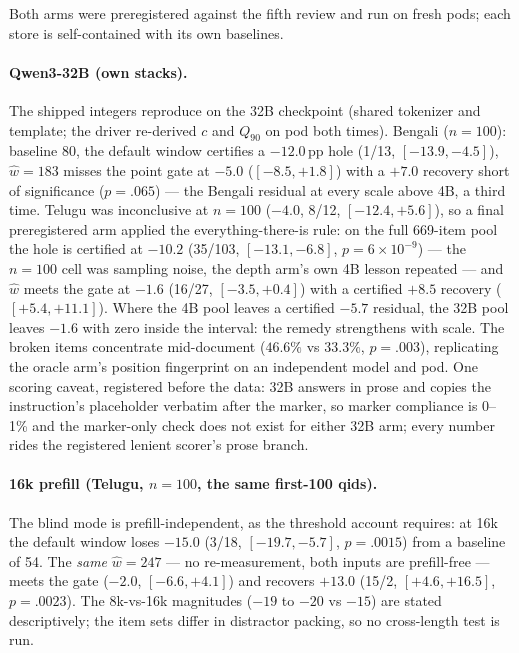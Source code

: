 \documentclass{article}
\begin{document}
Both arms were preregistered against the fifth review and run on
fresh pods; each store is self-contained with its own baselines.

\paragraph{Qwen3-32B (own stacks).} The shipped integers reproduce
on the 32B checkpoint (shared tokenizer and template; the driver
re-derived $c$ and $Q_{90}$ on pod both times). Bengali ($n{=}100$):
baseline 80, the default window certifies a $-12.0$\,pp hole (1/13,
$[-13.9,-4.5]$), $\hat w{=}183$ misses the point gate at $-5.0$
($[-8.5,+1.8]$) with a $+7.0$ recovery short of significance
($p{=}.065$) --- the Bengali residual at every scale above 4B, a
third time. Telugu was inconclusive at $n{=}100$ ($-4.0$, 8/12,
$[-12.4,+5.6]$), so a final preregistered arm applied the
everything-there-is rule: on the full 669-item pool the hole is
certified at $-10.2$ (35/103, $[-13.1,-6.8]$, $p{=}6{\times}10^{-9}$)
--- the $n{=}100$ cell was sampling noise, the depth arm's own 4B
lesson repeated --- and $\hat w$ meets the gate at $-1.6$ (16/27,
$[-3.5,+0.4]$) with a certified $+8.5$ recovery ($[+5.4,+11.1]$).
Where the 4B pool leaves a certified $-5.7$ residual, the 32B pool
leaves $-1.6$ with zero inside the interval: the remedy strengthens
with scale. The broken items concentrate mid-document ($46.6\%$ vs
$33.3\%$, $p{=}.003$), replicating the oracle arm's position
fingerprint on an independent model and pod. One scoring caveat,
registered before the data: 32B answers in prose and copies the
instruction's placeholder verbatim after the marker, so marker
compliance is 0--1\% and the marker-only check does not exist for
either 32B arm; every number rides the registered lenient scorer's
prose branch.

\paragraph{16k prefill (Telugu, $n{=}100$, the same first-100
qids).} The blind mode is prefill-independent, as the threshold
account requires: at 16k the default window loses $-15.0$ (3/18,
$[-19.7,-5.7]$, $p{=}.0015$) from a baseline of 54. The \emph{same}
$\hat w{=}247$ --- no re-measurement, both inputs are prefill-free
--- meets the gate ($-2.0$, $[-6.6,+4.1]$) and recovers $+13.0$
(15/2, $[+4.6,+16.5]$, $p{=}.0023$). The 8k-vs-16k magnitudes ($-19$
to $-20$ vs $-15$) are stated descriptively; the item sets differ in
distractor packing, so no cross-length test is run.
\end{document}
